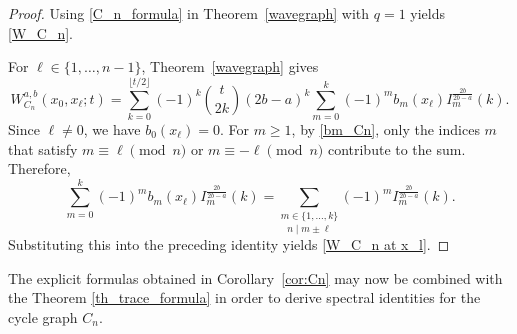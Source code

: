 \documentclass[reqno,10pt]{amsart}
\theoremstyle{definition}
\numberwithin{equation}{section}
\begin{document}
\begin{proof}
Using
\eqref{C_n_formula} in Theorem~\ref{wavegraph} with $q=1$  yields \eqref{W_C_n}.

For $\ell\in\{1,\ldots,n-1\}$,
Theorem~\ref{wavegraph} gives
\[
W_{C_n}^{a,b}(x_0,x_\ell;t)
=
\sum_{k=0}^{\lfloor t/2 \rfloor}
(-1)^k
\binom{t}{2k}
(2b-a)^k
\sum_{m=0}^{k}
(-1)^m
b_m(x_\ell)
I_m^{\frac{2b}{2b-a}}(k).
\]
Since $\ell\ne0$, we have $b_0(x_\ell)=0$. For $m\ge1$, by
\eqref{bm_Cn},
only the indices $m$ that satisfy
$m\equiv \ell\pmod n$ or $m\equiv -\ell\pmod n$ contribute to the sum.
Therefore,
\begin{equation}\label{eq. bm circle sum}
\sum_{m=0}^{k}
(-1)^m
b_m(x_\ell)
I_m^{\frac{2b}{2b-a}}(k)
=
\underset{n\mid m\pm \ell}{\sum_{m\in\{1,\ldots,k\}}}
(-1)^m
I_m^{\frac{2b}{2b-a}}(k).
\end{equation}
Substituting this into the preceding identity yields
\eqref{W_C_n at x_l}.

\end{proof}

The explicit formulas obtained in Corollary~\ref{cor:Cn} may now be combined with the Theorem \ref{th_trace_formula} in order to derive spectral identities for the cycle graph $C_n$.
\end{document}
